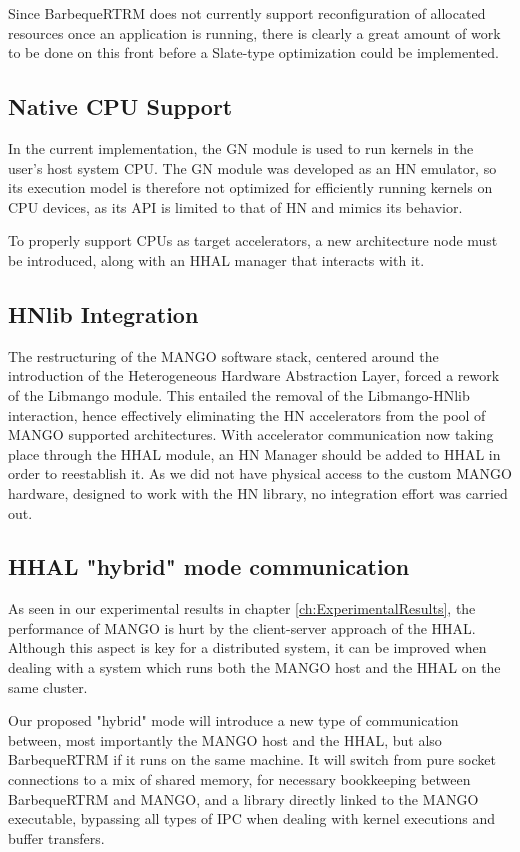 Since BarbequeRTRM does not currently support reconfiguration of allocated resources once an application is running, there is clearly a great amount of work to be done on this front before a Slate-type optimization could be implemented.

\subsection{Native CPU Support}

In the current implementation, the GN module is used to run kernels in the user's host system CPU. The GN module was developed as an HN emulator, so its execution model is therefore not optimized for efficiently running kernels on CPU devices, as its API is limited to that of HN and mimics its behavior.

To properly support CPUs as target accelerators, a new architecture node must be introduced, along with an HHAL manager that interacts with it.

\subsection{HNlib Integration}

The restructuring of the MANGO software stack, centered around the introduction of the Heterogeneous Hardware Abstraction Layer, forced a rework of the Libmango module. This entailed the removal of the Libmango-HNlib interaction, hence effectively eliminating the HN accelerators from the pool of MANGO supported architectures.
With accelerator communication now taking place through the HHAL module, an HN Manager should be added to HHAL in order to reestablish it.
As we did not have physical access to the custom MANGO hardware, designed to work with the HN library, no integration effort was carried out.

\subsection{HHAL "hybrid" mode communication} \label{sub-sect:hhal-hybrid-mode}

As seen in our experimental results in chapter \ref{ch:ExperimentalResults}, the performance of MANGO is hurt by the client-server approach of the HHAL. Although this aspect is key for a distributed system, it can be improved when dealing with a system which runs both the MANGO host and the HHAL on the same cluster. 

Our proposed "hybrid" mode will introduce a new type of communication between, most importantly the MANGO host and the HHAL, but also BarbequeRTRM if it runs on the same machine. It will switch from pure socket connections to a mix of shared memory, for necessary bookkeeping between BarbequeRTRM and MANGO, and a library directly linked to the MANGO executable, bypassing all types of IPC when dealing with kernel executions and buffer transfers.

